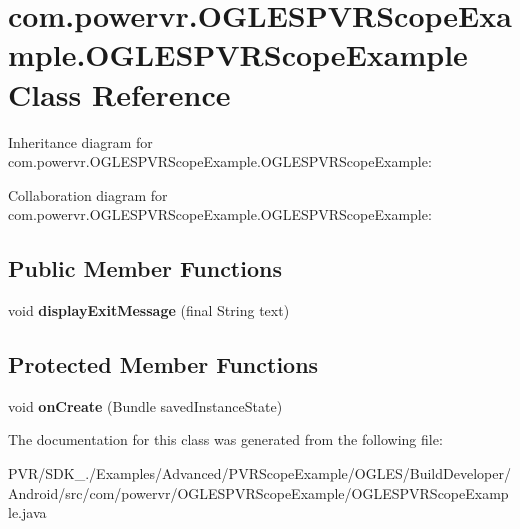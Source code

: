 \hypertarget{classcom_1_1powervr_1_1_o_g_l_e_s_p_v_r_scope_example_1_1_o_g_l_e_s_p_v_r_scope_example}{\section{com.\+powervr.\+O\+G\+L\+E\+S\+P\+V\+R\+Scope\+Example.\+O\+G\+L\+E\+S\+P\+V\+R\+Scope\+Example Class Reference}
\label{classcom_1_1powervr_1_1_o_g_l_e_s_p_v_r_scope_example_1_1_o_g_l_e_s_p_v_r_scope_example}
}


Inheritance diagram for com.\+powervr.\+O\+G\+L\+E\+S\+P\+V\+R\+Scope\+Example.\+O\+G\+L\+E\+S\+P\+V\+R\+Scope\+Example\+:


Collaboration diagram for com.\+powervr.\+O\+G\+L\+E\+S\+P\+V\+R\+Scope\+Example.\+O\+G\+L\+E\+S\+P\+V\+R\+Scope\+Example\+:
\subsection*{Public Member Functions}
\begin{DoxyCompactItemize}
\item 
\hypertarget{classcom_1_1powervr_1_1_o_g_l_e_s_p_v_r_scope_example_1_1_o_g_l_e_s_p_v_r_scope_example_a5f6d3d1688d74ba721adf023aafd0474}{void {\bfseries display\+Exit\+Message} (final String text)}\label{classcom_1_1powervr_1_1_o_g_l_e_s_p_v_r_scope_example_1_1_o_g_l_e_s_p_v_r_scope_example_a5f6d3d1688d74ba721adf023aafd0474}

\end{DoxyCompactItemize}
\subsection*{Protected Member Functions}
\begin{DoxyCompactItemize}
\item 
\hypertarget{classcom_1_1powervr_1_1_o_g_l_e_s_p_v_r_scope_example_1_1_o_g_l_e_s_p_v_r_scope_example_a4311eb67ce11dbb1db05e8845b74f478}{void {\bfseries on\+Create} (Bundle saved\+Instance\+State)}\label{classcom_1_1powervr_1_1_o_g_l_e_s_p_v_r_scope_example_1_1_o_g_l_e_s_p_v_r_scope_example_a4311eb67ce11dbb1db05e8845b74f478}

\end{DoxyCompactItemize}


The documentation for this class was generated from the following file\+:\begin{DoxyCompactItemize}
\item 
P\+V\+R/\+S\+D\+K\+\_./\+Examples/\+Advanced/\+P\+V\+R\+Scope\+Example/\+O\+G\+L\+E\+S/\+Build\+Developer/\+Android/src/com/powervr/\+O\+G\+L\+E\+S\+P\+V\+R\+Scope\+Example/O\+G\+L\+E\+S\+P\+V\+R\+Scope\+Example.\+java\end{DoxyCompactItemize}
